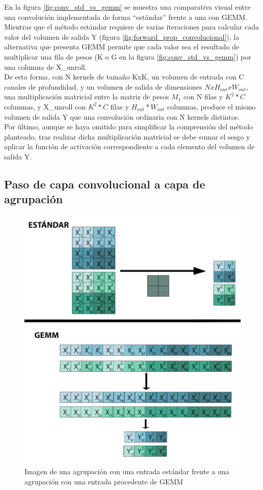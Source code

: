 En la figura \ref{fig:conv_std_vs_gemm} se muestra una comparativa visual entre una convolución implementada de forma ``estándar'' frente a una con GEMM. \\
Mientras que el método estándar requiere de varias iteraciones para calcular cada valor del volumen de salida Y (figura \ref{fig:forward_prop_convolucional}), la alternativa que presenta GEMM permite que cada valor sea el resultado de multiplicar una fila de pesos (K o G en la figura \ref{fig:conv_std_vs_gemm}) por una columna de X\_unroll. \cite{Programming_Massively} \\
De esta forma, con N kernels de tamaño KxK, un volumen de entrada con C canales de profundidad, y un volumen de salida de dimensiones $NxH_{out}xW_{out}$, una multiplicación matricial entre la matriz de pesos $M_1$ con N filas y $K^2*C$ columnas, y X\_unroll con $K^2*C$ filas y $H_{out}*W_{out}$ columnas, produce el mismo volumen de salida Y que una convolución ordinaria con N kernels distintos. \\
Por último, aunque se haya omitido para simplificar la comprensión del método planteado, tras realizar dicha multiplicación matricial se debe sumar el sesgo y aplicar la función de activación correspondiente a cada elemento del volumen de salida Y.

\subsection{Paso de capa convolucional a capa de agrupación}

\begin{figure}[H]
	\centering
	\includegraphics[scale=0.35]{imagenes/maxpool_std_vs_gemm.jpg}  
	\caption{Imagen de una agrupación con una entrada estándar frente a una agrupación con una entrada procedente de GEMM}
	\label{fig:maxpool_std_vs_gemm}
\end{figure}